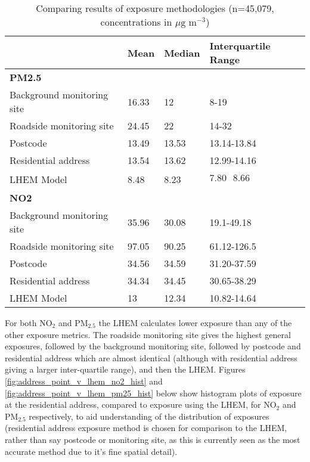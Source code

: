 \begin{table}[H]
\centering
    \begin{tabular}{ | l | l | l | l | }
    \hline 
& Mean & Median & Interquartile Range \\ \hline
\multicolumn{4}{|l|}{\bfseries{PM2.5}}                            \\ \hline
Background monitoring site & 16.33 & 12     & 8-19                \\ \hline
Roadside monitoring site   & 24.45 & 22     & 14-32               \\ \hline
Postcode                   & 13.49 & 13.53  & 13.14-13.84         \\ \hline
Residential address        & 13.54 & 13.62  & 12.99-14.16         \\ \hline
LHEM Model                 & 8.48  & 8.23   & 7.80  8.66         \\ \hline
\multicolumn{4}{|l|}{\bfseries{NO2}}                              \\ \hline
Background monitoring site & 35.96 & 30.08  & 19.1-49.18          \\ \hline
Roadside monitoring site   & 97.05 & 90.25  & 61.12-126.5         \\ \hline
Postcode                   & 34.56 & 34.59  & 31.20-37.59         \\ \hline
Residential address        & 34.34 & 34.45  & 30.65-38.29         \\ \hline
LHEM Model                 & 13    & 12.34  & 10.82-14.64         \\ \hline
\end{tabular}
\caption{Comparing results of exposure methodologies (n=45,079, concentrations in $\mu \text{g m}^{-3}$)}
\label{tab:comparing_methods}
\end{table}

For both NO$_{2}$ and PM$_{2.5}$ the LHEM calculates lower exposure than any of the other exposure metrics. The roadside monitoring site gives the highest general exposures, followed by the background monitoring site, followed by postcode and residential address which are almost identical (although with residential address giving a larger inter-quartile range), and then the LHEM. Figures \ref{fig:address_point_v_lhem_no2_hist} and \ref{fig:address_point_v_lhem_pm25_hist} below show histogram plots of exposure at the residential address, compared to exposure using the LHEM, for NO$_{2}$ and PM$_{2.5}$ respectively, to aid understanding of the distribution of exposures (residential address exposure method is chosen for comparison to the LHEM, rather than say postcode or monitoring site, as this is currently seen as the most accurate method due to it's fine spatial detail).

